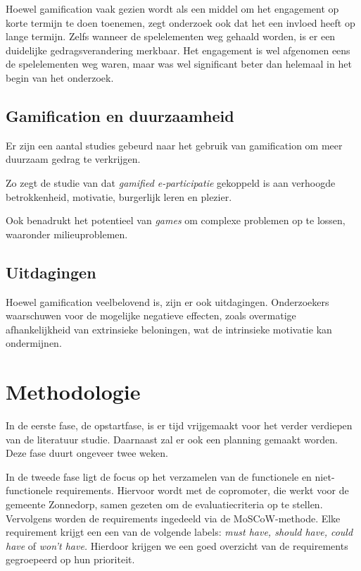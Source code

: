 \documentclass{hogent-article}
\begin{document}
Hoewel gamification vaak gezien wordt als een middel om het engagement op korte termijn te doen toenemen, zegt onderzoek ook dat het een invloed heeft op lange termijn. Zelfs wanneer de spelelementen weg gehaald worden, is er een duidelijke gedragsverandering merkbaar. Het engagement is wel afgenomen eens de spelelementen weg waren, maar was wel significant beter dan helemaal in het begin van het onderzoek. \autocite{Li_2024}

\subsection{Gamification en duurzaamheid}
Er zijn een aantal studies gebeurd naar het gebruik van gamification om meer duurzaam gedrag te verkrijgen. 

Zo zegt de studie van \textcite{Hassan_2020} dat \textit{gamified e-participatie} gekoppeld is aan verhoogde betrokkenheid, motivatie, burgerlijk leren en plezier.

Ook \textcite{McConigal2011} benadrukt het potentieel van \emph{games} om complexe problemen op te lossen, waaronder milieuproblemen.

\subsection{Uitdagingen}
Hoewel gamification veelbelovend is, zijn er ook uitdagingen. Onderzoekers waarschuwen voor de mogelijke negatieve effecten, zoals overmatige afhankelijkheid van extrinsieke beloningen, wat de intrinsieke motivatie kan ondermijnen. \autocite{Buznea2021}


\section{Methodologie}%
\label{sec:methodologie}

In de eerste fase, de opstartfase, is er tijd vrijgemaakt voor het verder verdiepen van de literatuur studie. Daarnaast zal er ook een planning gemaakt worden. Deze fase duurt ongeveer twee weken.

In de tweede fase ligt de focus op het verzamelen van de functionele en niet-functionele requirements. Hiervoor wordt met de copromoter, die werkt voor de gemeente Zonnedorp, samen gezeten om de evaluatiecriteria op te stellen. Vervolgens worden de requirements ingedeeld via de MoSCoW-methode. Elke requirement krijgt een een van de volgende labels: \emph{must have, should have, could have} of \emph{won't have.} Hierdoor krijgen we een goed overzicht van de requirements gegroepeerd op hun prioriteit.
\end{document}
